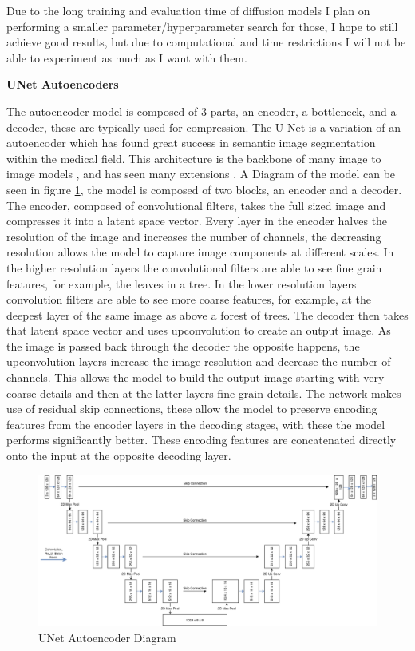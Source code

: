 \documentclass{UoYCSproject}
\begin{document}
Due to the long training and evaluation time of diffusion models I plan on performing a smaller parameter/hyperparameter search for those, I hope to still achieve good results, but due to computational and time restrictions I will not be able to experiment as much as I want with them.

\textbf{UNet Autoencoders}

The autoencoder model is composed of 3 parts, an encoder, a bottleneck, and a decoder, these are typically used for compression. The U-Net \cite{ronneberger2015unet} is a variation of an autoencoder which has found great success in semantic image segmentation within the medical field. This architecture is the backbone of many image to image models \cite{isola2018imagetoimage,saharia2022palette,dhariwal2021diffusion}, and has seen many extensions \cite{zhou2020unet, Qin_2020}. A Diagram of the model can be seen in figure \ref{fig:autoencoderDiagram}, the model is composed of two blocks, an encoder and a decoder. 
The encoder, composed of convolutional filters, takes the full sized image and compresses it into a latent space vector.
Every layer in the encoder halves the resolution of the image and increases the number of channels, the decreasing resolution allows the model to capture image components at different scales. 
In the higher resolution layers the convolutional filters are able to see fine grain features, for example, the leaves in a tree. In the lower resolution layers convolution filters are able to see more coarse features, for example, at the deepest layer of the same image as above a forest of trees. 
The decoder then takes that latent space vector and uses upconvolution to create an output image. 
As the image is passed back through the decoder the opposite happens, the upconvolution layers increase the image resolution and decrease the number of channels. This allows the model to build the output image starting with very coarse details and then at the latter layers fine grain details.
The network makes use of residual skip connections, these allow the model to preserve encoding features from the encoder layers in the decoding stages, with these the model performs significantly better. These encoding features are concatenated directly onto the input at the opposite decoding layer. 

\begin{figure}[h]
    \centering
    \includegraphics[width=\linewidth]{UNet Diagram}
    \caption{UNet Autoencoder Diagram}
    \label{fig:autoencoderDiagram}
\end{figure}
\end{document}
